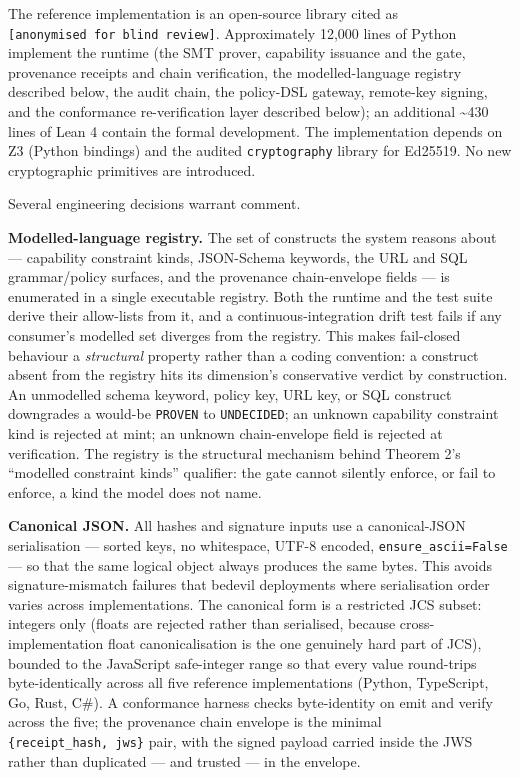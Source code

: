 The reference implementation is an open-source library cited as
\texttt{{[}anonymised\ for\ blind\ review{]}}. Approximately 12,000
lines of Python implement the runtime (the SMT prover, capability
issuance and the gate, provenance receipts and chain verification, the
modelled-language registry described below, the audit chain, the
policy-DSL gateway, remote-key signing, and the conformance
re-verification layer described below); an additional \textasciitilde430
lines of Lean 4 contain the formal development. The implementation
depends on Z3 (Python bindings) and the audited \texttt{cryptography}
library for Ed25519. No new cryptographic primitives are introduced.

Several engineering decisions warrant comment.

\textbf{Modelled-language registry.} The set of constructs the system
reasons about --- capability constraint kinds, JSON-Schema keywords, the
URL and SQL grammar/policy surfaces, and the provenance chain-envelope
fields --- is enumerated in a single executable registry. Both the
runtime and the test suite derive their allow-lists from it, and a
continuous-integration drift test fails if any consumer's modelled set
diverges from the registry. This makes fail-closed behaviour a
\emph{structural} property rather than a coding convention: a construct
absent from the registry hits its dimension's conservative verdict by
construction. An unmodelled schema keyword, policy key, URL key, or SQL
construct downgrades a would-be \texttt{PROVEN} to \texttt{UNDECIDED};
an unknown capability constraint kind is rejected at mint; an unknown
chain-envelope field is rejected at verification. The registry is the
structural mechanism behind Theorem 2's ``modelled constraint kinds''
qualifier: the gate cannot silently enforce, or fail to enforce, a kind
the model does not name.

\textbf{Canonical JSON.} All hashes and signature inputs use a
canonical-JSON serialisation --- sorted keys, no whitespace, UTF-8
encoded, \texttt{ensure\_ascii=False} --- so that the same logical
object always produces the same bytes. This avoids signature-mismatch
failures that bedevil deployments where serialisation order varies
across implementations. The canonical form is a restricted JCS subset:
integers only (floats are rejected rather than serialised, because
cross-implementation float canonicalisation is the one genuinely hard
part of JCS), bounded to the JavaScript safe-integer range so that every
value round-trips byte-identically across all five reference
implementations (Python, TypeScript, Go, Rust, C\#). A conformance
harness checks byte-identity on emit and verify across the five; the
provenance chain envelope is the minimal
\texttt{\{receipt\_hash,\ jws\}} pair, with the signed payload carried
inside the JWS rather than duplicated --- and trusted --- in the
envelope.

